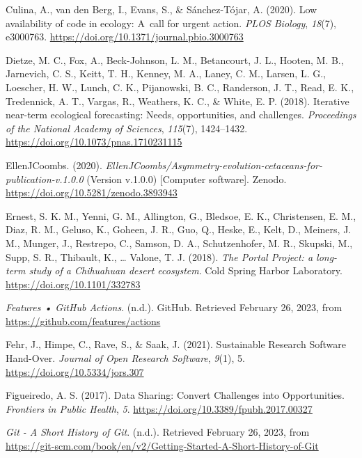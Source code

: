 \begin{CSLReferences}{1}{0}
\leavevmode{}%
Culina, A., van den Berg, I., Evans, S., \& Sánchez-Tójar, A. (2020). Low availability of code in ecology: A~call for urgent action. \emph{PLOS Biology}, \emph{18}(7), e3000763. \url{https://doi.org/10.1371/journal.pbio.3000763}

\leavevmode{}%
Dietze, M. C., Fox, A., Beck-Johnson, L. M., Betancourt, J. L., Hooten, M. B., Jarnevich, C. S., Keitt, T. H., Kenney, M. A., Laney, C. M., Larsen, L. G., Loescher, H. W., Lunch, C. K., Pijanowski, B. C., Randerson, J. T., Read, E. K., Tredennick, A. T., Vargas, R., Weathers, K. C., \& White, E. P. (2018). Iterative near-term ecological forecasting: Needs, opportunities, and challenges. \emph{Proceedings of the National Academy of Sciences}, \emph{115}(7), 1424--1432. \url{https://doi.org/10.1073/pnas.1710231115}

\leavevmode{}%
EllenJCoombs. (2020). \emph{EllenJCoombs/Asymmetry-evolution-cetaceans-for-publication-v.1.0.0} (Version v.1.0.0) {[}Computer software{]}. Zenodo. \url{https://doi.org/10.5281/zenodo.3893943}

\leavevmode{}%
Ernest, S. K. M., Yenni, G. M., Allington, G., Bledsoe, E. K., Christensen, E. M., Diaz, R. M., Geluso, K., Goheen, J. R., Guo, Q., Heske, E., Kelt, D., Meiners, J. M., Munger, J., Restrepo, C., Samson, D. A., Schutzenhofer, M. R., Skupski, M., Supp, S. R., Thibault, K., \ldots{} Valone, T. J. (2018). \emph{The Portal Project: a long-term study of a Chihuahuan desert ecosystem}. Cold Spring Harbor Laboratory. \url{https://doi.org/10.1101/332783}

\leavevmode{}%
\emph{Features • GitHub Actions}. (n.d.). GitHub. Retrieved February 26, 2023, from \url{https://github.com/features/actions}

\leavevmode{}%
Fehr, J., Himpe, C., Rave, S., \& Saak, J. (2021). Sustainable Research Software Hand-Over. \emph{Journal of Open Research Software}, \emph{9}(1), 5. \url{https://doi.org/10.5334/jors.307}

\leavevmode{}%
Figueiredo, A. S. (2017). Data Sharing: Convert Challenges into Opportunities. \emph{Frontiers in Public Health}, \emph{5}. \url{https://doi.org/10.3389/fpubh.2017.00327}

\leavevmode{}%
\emph{Git - A Short History of Git}. (n.d.). Retrieved February 26, 2023, from \url{https://git-scm.com/book/en/v2/Getting-Started-A-Short-History-of-Git}


\end{CSLReferences}
